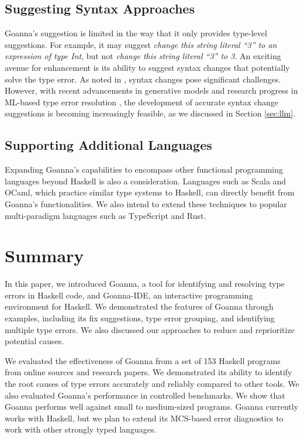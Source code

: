 \documentclass[pdflatex,lineno,sn-nature,Numbered]{sn-jnl}%
\begin{document}
\subsection{Suggesting Syntax Approaches}

Goanna's suggestion is limited in the way that it only provides type-level suggestions. For example, it may suggest {\it change this string literal ``3'' to an expression of type Int}, but not {\it change this string literal ``3'' to 3}.  An exciting avenue for enhancement is its ability to suggest syntax changes that potentially solve the type error. As noted in \cite{Chen2014-dz}, syntax changes pose significant challenges. However, with recent advancements in generative models and research progress in ML-based type error resolution \cite{Seidel2017-uf}, the development of accurate syntax change suggestions is becoming increasingly feasible, as we discussed in Section \ref{sec:llm}.

\subsection{Supporting Additional Languages}

Expanding Goanna's capabilities to encompass other functional programming languages beyond Haskell is also a consideration. Languages such as Scala and OCaml, which practice similar type systems to Haskell, can directly benefit from Goanna's functionalities. We also intend to extend these techniques to popular multi-paradigm languages such as TypeScript and Rust.



\section{Summary} \label{sec:conclusion}

In this paper, we introduced Goanna, a tool for identifying and resolving type errors in Haskell code, and Goanna-IDE, an interactive programming environment for Haskell. We demonstrated the features of Goanna through examples, including its fix suggestions, type error grouping, and identifying multiple type errors. We also discussed our approaches to reduce and reprioritize potential causes.

We evaluated the effectiveness of Goanna from a set of 153 Haskell programs from online sources and research papers. We demonstrated its ability to identify the root causes of type errors accurately and reliably compared to other tools. We also evaluated Goanna's performance in controlled benchmarks. We show that Goanna performs well against small to medium-sized programs. Goanna currently works with Haskell, but we plan to extend its MCS-based error diagnostics to work with other strongly typed languages.
\end{document}
